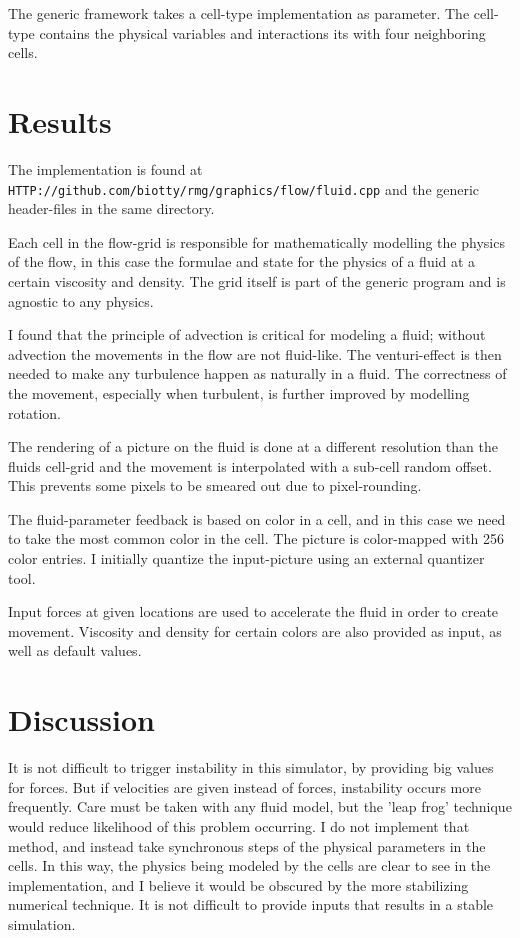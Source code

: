 \documentclass{article}
\begin{document}
The generic framework takes a cell-type implementation as
parameter.  The cell-type contains the physical variables
and interactions its with four neighboring cells.

\section{Results}

The implementation is found at
\texttt{HTTP://github.com/biotty/rmg/graphics/flow/fluid.cpp}
and the generic header-files in the same directory.

Each cell in the flow-grid is responsible for mathematically
modelling the physics of the flow, in this case the formulae
and state for the physics of a fluid at a certain
viscosity and density.  The grid itself is part of the
generic program and is agnostic to any physics.

I found that the principle of advection is critical for
modeling a fluid; without advection the movements in the flow
are not fluid-like.  The venturi-effect is then needed to
make any turbulence happen as naturally in a fluid.
The correctness of the movement, especially when turbulent,
is further improved by modelling rotation.

The rendering of a picture on the fluid is done at a
different resolution than the fluids cell-grid and the
movement is interpolated with a sub-cell random offset.
This prevents some pixels to be smeared out due to
pixel-rounding.

The fluid-parameter feedback is based on color in a cell,
and in this case we need to take the most common color
in the cell.  The picture is color-mapped with 256
color entries.  I initially quantize the input-picture
using an external quantizer tool.

Input forces at given locations are used to accelerate
the fluid in order to create movement.
Viscosity and density for certain colors are also
provided as input, as well as default values.

\section{Discussion}

It is not difficult to trigger instability in this
simulator, by providing big values for forces.
But if velocities are given instead of forces,
instability occurs more frequently.
Care must be taken with any fluid model,
but the 'leap frog' technique would reduce
likelihood of this problem occurring.
I do not implement that method, and instead take
synchronous steps of the physical parameters in the cells.
In this way, the physics being modeled by the cells are clear
to see in the implementation, and I believe it would be
obscured by the more stabilizing numerical technique.
It is not difficult to provide inputs
that results in a stable simulation.
\end{document}
